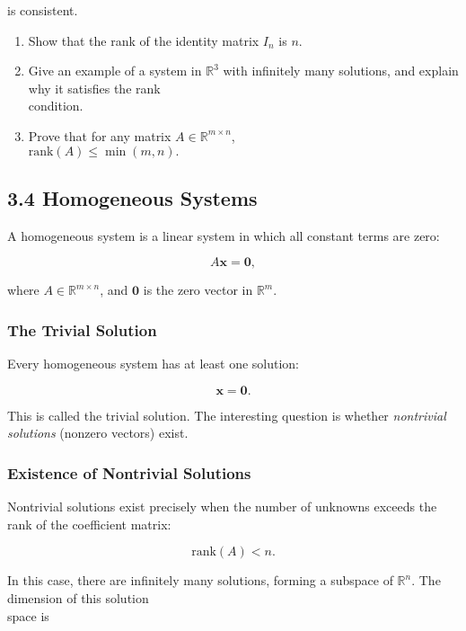 \documentclass[
  12pt,
  a4paper,
]{article}
\begin{document}
is consistent.

\begin{enumerate}
\def\labelenumi{\arabic{enumi}.}
\item
  Show that the rank of the identity matrix \(I_n\) is \(n\).
\item
  Give an example of a system in \(\mathbb{R}^3\) with infinitely many
  solutions, and explain why it satisfies the rank\\
  condition.
\item
  Prove that for any matrix \(A \in \mathbb{R}^{m \times n}\),\\
  \(
  \text{rank}(A) \leq \min(m,n).
  \)
\end{enumerate}

\subsection{3.4 Homogeneous Systems}\label{34-homogeneous-systems}

A homogeneous system is a linear system in which all constant terms are
zero:

\[A\mathbf{x} = \mathbf{0},\]

where \(A \in \mathbb{R}^{m \times n}\), and \(\mathbf{0}\) is the zero
vector in \(\mathbb{R}^m\).

\subsubsection{The Trivial Solution}\label{the-trivial-solution}

Every homogeneous system has at least one solution:

\[\mathbf{x} = \mathbf{0}.\]

This is called the trivial solution. The interesting question is whether
\emph{nontrivial solutions} (nonzero vectors) exist.

\subsubsection{Existence of Nontrivial
Solutions}\label{existence-of-nontrivial-solutions}

Nontrivial solutions exist precisely when the number of unknowns exceeds
the rank of the coefficient matrix:

\[\text{rank}(A) < n.\]

In this case, there are infinitely many solutions, forming a subspace of
\(\mathbb{R}^n\). The dimension of this solution\\
space is
\end{document}
